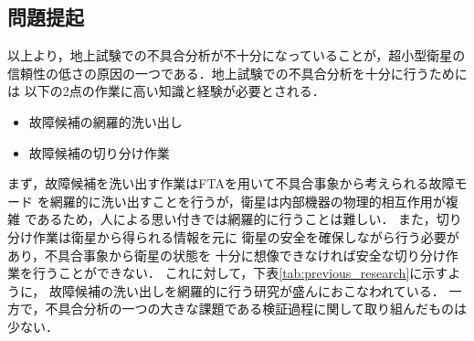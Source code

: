 \documentclass[11pt]{jsarticle}%
\begin{document}
\begin{multicols}{2}
  \subsection{問題提起}
  \vspace{-1zh}
  以上より，地上試験での不具合分析が不十分になっていることが，超小型衛星の
  信頼性の低さの原因の一つである．地上試験での不具合分析を十分に行うためには
  以下の2点の作業に高い知識と経験が必要とされる．
  \begin{itemize}
    \item 故障候補の網羅的洗い出し
    \item 故障候補の切り分け作業
  \end{itemize}
  まず，故障候補を洗い出す作業はFTAを用いて不具合事象から考えられる故障モード
  を網羅的に洗い出すことを行うが，衛星は内部機器の物理的相互作用が複雑
  であるため，人による思い付きでは網羅的に行うことは難しい．
  また，切り分け作業は衛星から得られる情報を元に
  衛星の安全を確保しながら行う必要があり，不具合事象から衛星の状態を
  十分に想像できなければ安全な切り分け作業を行うことができない．
これに対して，下表\ref{tab:previous_research}に示すように，
故障候補の洗い出しを網羅的に行う研究が盛んにおこなわれている．
一方で，不具合分析の一つの大きな課題である検証過程に関して取り組んだものは少ない．

\vspace{-1zh}
\begin{table}[H]
  \centering
  \caption{不具合分析手法の比較}
  \label{tab:previous_research}
\end{table}
\vspace{-1zh}

\end{multicols}
\end{document}
